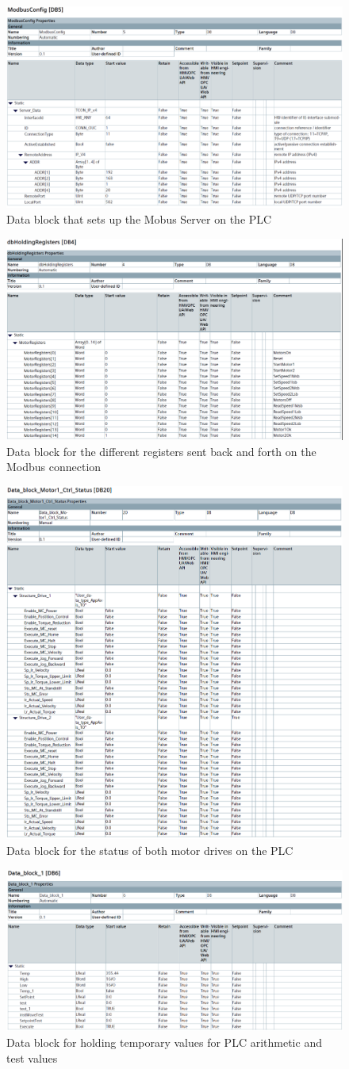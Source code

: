 \begin{figure}[H]
    \centering
    \includegraphics[width=0.5\linewidth]{DBs/ModbusConfig.PNG}
    \caption{Data block that sets up the Mobus Server on the PLC}
    \label{fig:ModbusConfig}
\end{figure}
\begin{figure}[H]
    \centering
    \includegraphics[width=0.5\linewidth]{DBs/dbHoldingRegisters.PNG}
    \caption{Data block for the different registers sent back and forth on the Modbus connection}
    \label{fig:dbHoldReg}
\end{figure}
\begin{figure}[H]
    \centering
    \includegraphics[width=0.5\linewidth]{DBs/MotorCtrlStatus.PNG}
    \caption{Data block for the status of both motor drives on the PLC}
    \label{fig:MotorSTS}
\end{figure}
\begin{figure}[H]
    \centering
    \includegraphics[width=0.5\linewidth]{DBs/temp.PNG}
    \caption{Data block for holding temporary values for PLC arithmetic and test values}
    \label{fig:temp}
\end{figure}